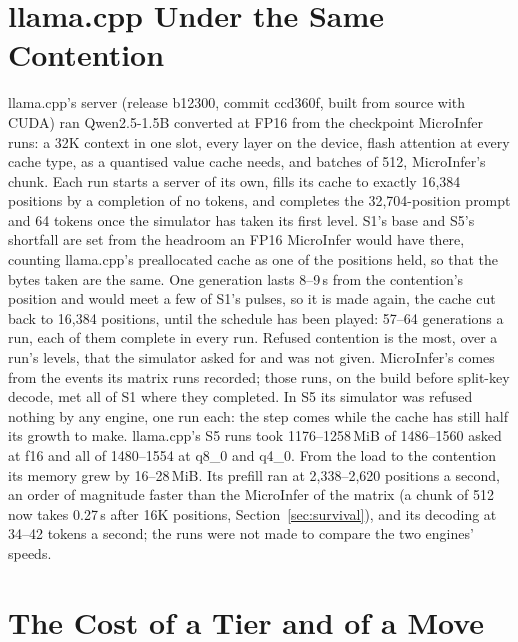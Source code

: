 \documentclass{article}
\begin{document}
\section{llama.cpp Under the Same Contention}
\label{app:llamacpp}

llama.cpp's server (release b12300, commit ccd360f, built from source with CUDA)
ran Qwen2.5-1.5B converted at FP16 from the checkpoint MicroInfer runs: a 32K
context in one slot, every layer on the device, flash attention at every cache
type, as a quantised value cache needs, and batches of 512, MicroInfer's chunk.
Each run starts a server of its own, fills its cache to exactly 16{,}384 positions
by a completion of no tokens, and completes the 32{,}704-position prompt and 64
tokens once the simulator has taken its first level. S1's base and S5's shortfall
are set from the headroom an FP16 MicroInfer would have there, counting
llama.cpp's preallocated cache as one of the positions held, so that the bytes
taken are the same. One generation lasts 8--9\,s from the contention's
position and would meet a few of S1's pulses, so it is made again, the cache cut
back to 16{,}384 positions, until the schedule has been played: 57--64
generations a run, each of them complete in every run. Refused contention is the
most, over a run's levels, that the simulator asked for and was not given.
MicroInfer's comes from the events its matrix runs recorded; those runs, on the
build before split-key decode, met all of S1 where they completed. In S5 its
simulator was refused nothing by any engine, one run each: the step comes while the cache
has still half its growth to make. llama.cpp's S5 runs took 1176--1258\,MiB of
1486--1560 asked at f16 and all of 1480--1554 at q8\_0 and q4\_0. From the load to
the contention its memory grew by 16--28\,MiB. Its prefill ran at
2{,}338--2{,}620 positions a second, an order of magnitude faster than the
MicroInfer of the matrix (a chunk of 512 now takes 0.27\,s after 16K positions,
Section~\ref{sec:survival}), and its decoding at 34--42 tokens a second; the runs
were not made to compare the two engines' speeds.

\section{The Cost of a Tier and of a Move}
\label{app:moves}
\end{document}
